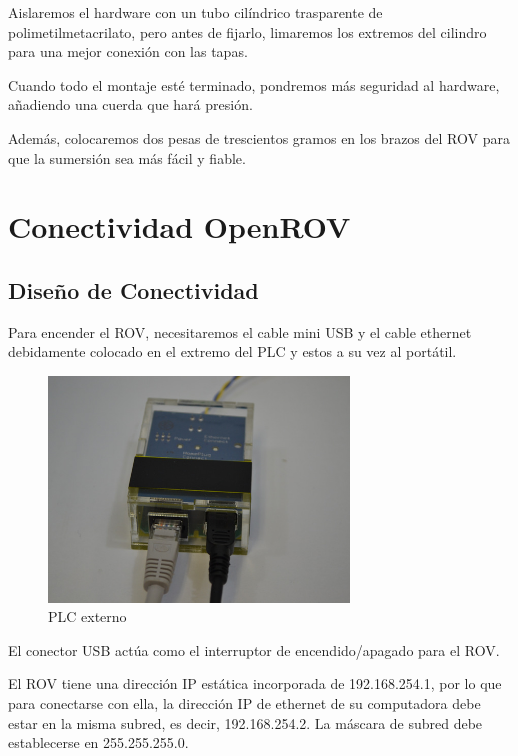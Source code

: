 Aislaremos el hardware con un tubo cilíndrico trasparente de polimetilmetacrilato, pero antes de fijarlo, limaremos los extremos del cilindro para una mejor conexión con las tapas.

Cuando todo el montaje esté terminado, pondremos más seguridad al hardware, añadiendo una cuerda que hará presión.

Además, colocaremos dos pesas de trescientos gramos en los brazos del ROV para que la sumersión sea más fácil y fiable.

\section{Conectividad OpenROV}
\label{cap:Conectividad OpenROV}
  
\subsection{Diseño de Conectividad}
\label{subsec:disenio}

Para encender el ROV, necesitaremos el cable mini USB y el cable ethernet debidamente colocado en el extremo del PLC y estos a su vez al portátil.

\begin{figure} [hbtp]
\begin{center}
  \includegraphics[width=8cm]{img/cap3/3_4/plc_externo}
\end{center}
\caption{PLC externo}
\label{fig:plc_ext}
\end{figure}
  
El conector USB actúa como el interruptor de encendido/apagado para el ROV.

El ROV tiene una dirección IP estática incorporada de 192.168.254.1, por lo que para conectarse con ella, la dirección IP de ethernet de su computadora debe estar en la misma subred, es decir, 192.168.254.2. La máscara de subred debe establecerse en 255.255.255.0.

